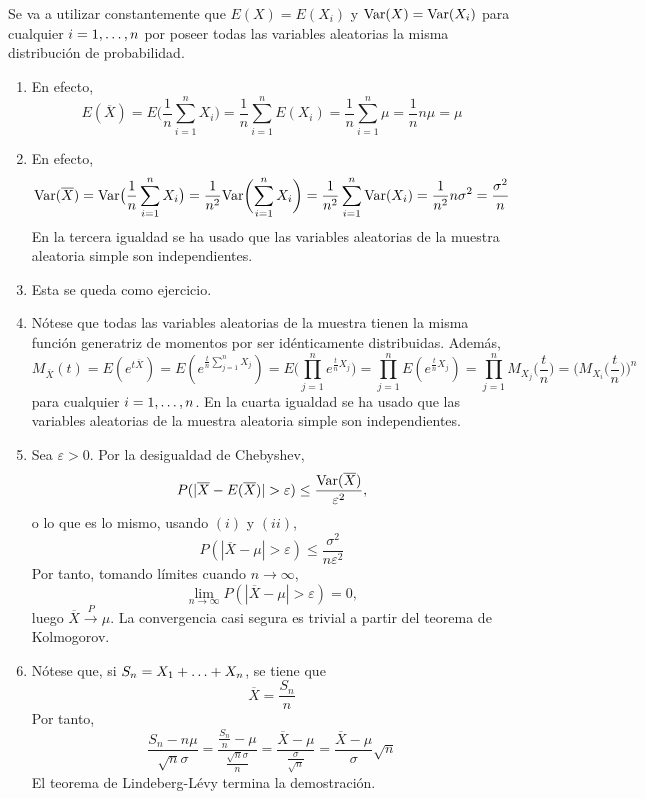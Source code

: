 \documentclass[11pt]{report}
\makeatletter
\renewenvironment{proof}[1][\proofname]{\par
  \pushQED{\qed}%
  \normalfont \topsep\z@skip %
  \trivlist
  \item[\hskip\labelsep
        \itshape
    #1\@addpunct{.}]\ignorespaces
}{%
  \popQED\endtrivlist\@endpefalse
}
\theoremstyle{definition}
\makeatother
\begin{document}
\begin{proof}
Se va a utilizar constantemente que $E(X)=E(X_i)$ y $\textup{Var}(X) = \textup{Var}(X_i)$ para cualquier $i = 1,\mathellipsis,n$ por poseer todas las variables aleatorias la misma distribución de probabilidad.
\begin{enumerate}
    \item En efecto,
    \[E(\overline{X})=E\bigl(\frac{1}{n}\sum_{i=1}^n X_i\bigr) = \frac{1}{n}\sum_{i=1}^nE(X_i) = \frac{1}{n}\sum_{i=1}^n \mu = \frac{1}{n} n \mu = \mu\]
    \item En efecto, \[\textup{Var}(\overline{X})=\textup{Var}\bigl(\frac{1}{n}\sum_{i=1}^n X_i\bigr) = \frac{1}{n^2}\textup{Var}\biggl(\sum_{i=1}^n X_i\biggr) = \frac{1}{n^2}\sum_{i=1}^n \textup{Var}(X_i) = \frac{1}{n^2}n\sigma^2 = \frac{\sigma^2}{n}\]
    En la tercera igualdad se ha usado que las variables aleatorias de la muestra aleatoria simple son independientes.
    \item Esta se queda como ejercicio.
    \item Nótese que todas las variables aleatorias de la muestra tienen la misma función generatriz de momentos por ser idénticamente distribuidas. Además,
    \[M_{\overline{X}}(t) = E(e^{t\overline{X}}) = E(e^{\frac{t}{n}\sum_{j=1}^nX_j}) = E\biggl(\prod_{j=1}^n e^{\frac{t}{n}X_j}\biggr) = \prod_{j=1}^n E(e^{\frac{t}{n}X_j}) = \prod_{j=1}^n M_{X_j}\biggl(\frac{t}{n}\biggr) = \biggl(M_{X_i}\biggl(\frac{t}{n}\biggr)\biggr)^n\]
    para cualquier $i = 1,\mathellipsis,n$. En la cuarta igualdad se ha usado que las variables aleatorias de la muestra aleatoria simple son independientes.
    \item Sea $\varepsilon>0$. Por la desigualdad de Chebyshev,
    \[P(|\overline{X}-E(\overline{X})|>\varepsilon) \leq \frac{\textup{Var}(\overline{X})}{\varepsilon^2},\]
    o lo que es lo mismo, usando $(i)$ y $(ii)$,
    \[P(|\overline{X}-\mu|> \varepsilon) \leq \frac{\sigma^2}{n\varepsilon^2}\]
    Por tanto, tomando límites cuando $n \to \infty$,
    \[\lim_{n \to \infty} P(|\overline{X}-\mu|>\varepsilon) = 0,\]
    luego $\overline{X} \xrightarrow{P}\mu$. La convergencia casi segura es trivial a partir del teorema de Kolmogorov.
    \item Nótese que, si $S_n = X_1+\mathellipsis+X_n$, se tiene que
    \[\overline{X} = \frac{S_n}{n}\]
    Por tanto,
    \[\frac{S_n-n\mu}{\sqrt{n}\sigma} = \frac{\frac{S_n}{n}-\mu}{\frac{\sqrt{n}\sigma}{n}} = \frac{\overline{X}-\mu}{\frac{\sigma}{\sqrt{n}}} = \frac{\overline{X}-\mu}{\sigma}\sqrt{n}\]
    El teorema de Lindeberg-Lévy termina la demostración. \qedhere
\end{enumerate}
\end{proof}
\end{document}
